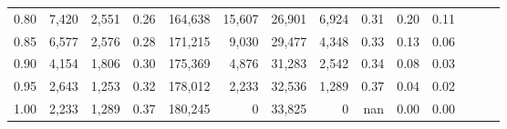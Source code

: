 \begin{tabular}{rrrrrrrrrrrrrr}
0.80 &   7,420 &  2,551 &  0.26 &  164,638 &   15,607 &  26,901 &   6,924 &  0.31 &  0.20 &      0.11 \\
0.85 &   6,577 &  2,576 &  0.28 &  171,215 &    9,030 &  29,477 &   4,348 &  0.33 &  0.13 &      0.06 \\
0.90 &   4,154 &  1,806 &  0.30 &  175,369 &    4,876 &  31,283 &   2,542 &  0.34 &  0.08 &      0.03 \\
0.95 &   2,643 &  1,253 &  0.32 &  178,012 &    2,233 &  32,536 &   1,289 &  0.37 &  0.04 &      0.02 \\
1.00 &   2,233 &  1,289 &  0.37 &  180,245 &        0 &  33,825 &       0 &   nan &  0.00 &      0.00 \\
\bottomrule
\end{tabular}
